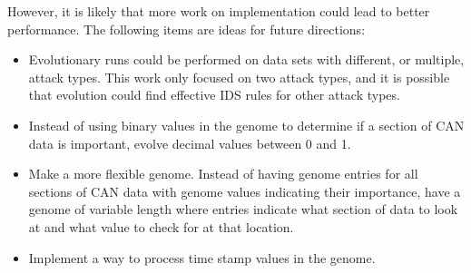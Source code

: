 \documentclass[10pt,conference]{IEEEtran}
\begin{document}
However, it is likely that more work on implementation could lead to better performance.  The following items are ideas for future directions:
\begin{itemize}
    \item Evolutionary runs could be performed on data sets with different, or multiple, attack types.  This work only focused on two attack types, and it is possible that evolution could find effective IDS rules for other attack types.
    \item Instead of using binary values in the genome to determine if a section of CAN data is important, evolve decimal values between 0 and 1.  
    \item Make a more flexible genome.  Instead of having genome entries for all sections of CAN data with genome values indicating their importance, have a genome of variable length where entries indicate what section of data to look at and what value to check for at that location.  
    \item Implement a way to process time stamp values in the genome.
\end{itemize}



\end{document}
